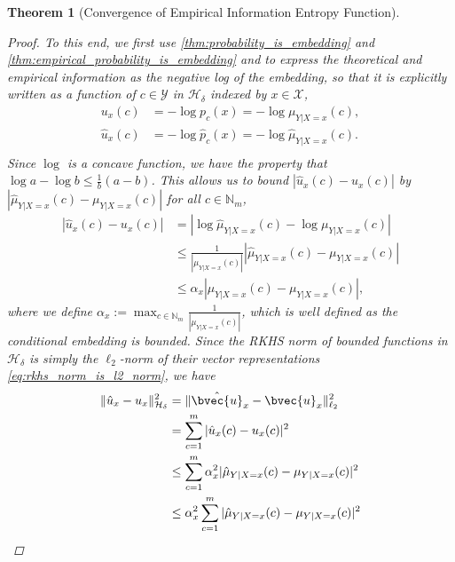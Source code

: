 \documentclass{article}
\newtheorem{theorem}{Theorem}[section]
\begin{document}
\begin{theorem}[Convergence of Empirical Information Entropy Function]
\begin{proof}
				To this end, we first use \cref{thm:probability_is_embedding} and \cref{thm:empirical_probability_is_embedding} and to express the theoretical and empirical information as the negative log of the embedding, so that it is explicitly written as a function of $c \in \mathcal{Y}$ in $\mathcal{H}_{\delta}$ indexed by $x \in \mathcal{X}$,
				\begin{equation}
					\begin{aligned}
						u_{x}(c) &= - \log{p_{c}(x)} = -\log{\mu_{Y | X = x}(c)}, \\
						\hat{u}_{x}(c) &= - \log{\hat{p}_{c}(x)} = -\log{\hat{\mu}_{Y | X = x}(c)}. \\
					\end{aligned}
				\end{equation}
				Since $\log$ is a concave function, we have the property that $\log{a} - \log{b} \leq \frac{1}{b} (a - b)$. This allows us to bound $| \hat{u}_{x}(c) - u_{x}(c) |$ by $| \hat{\mu}_{Y | X = x}(c) - \mu_{Y | X = x}(c) |$ for all $c \in \mathbb{N}_{m}$,
				\begin{equation}
					\begin{aligned}
						| \hat{u}_{x}(c) - u_{x}(c) | &= | \log{\hat{\mu}_{Y | X = x}(c)} - \log{\mu_{Y | X = x}(c)} | \\
						&\leq \frac{1}{| \mu_{Y | X = x}(c) |} | \hat{\mu}_{Y | X = x}(c) - \mu_{Y | X = x}(c) | \\
						&\leq \alpha_{x} | \hat{\mu}_{Y | X = x}(c) - \mu_{Y | X = x}(c) |,
					\end{aligned}
				\end{equation}
				where we define $\alpha_{x} := \max_{c \in \mathbb{N}_{m}} \frac{1}{| \mu_{Y | X = x}(c) |}$, which is well defined as the conditional embedding is bounded. Since the RKHS norm of bounded functions in $\mathcal{H}_{\delta}$ is simply the $\ell_{2}$-norm of their vector representations \eqref{eq:rkhs_norm_is_l2_norm}, we have
				\begin{equation}
					\begin{aligned}
						\| \hat{u}_{x} - u_{x} \|_{\mathcal{H}_{\delta}}^{2} &= \| \hat{\bvec{u}}_{x} - \bvec{u}_{x} \|_{\ell_{2}}^{2} \\
						&= \sum_{c = 1}^{m} | \hat{u}_{x}(c) - u_{x}(c) |^{2} \\
						&\leq \sum_{c = 1}^{m} \alpha_{x}^{2} | \hat{\mu}_{Y | X = x}(c) - \mu_{Y | X = x}(c) |^{2} \\
						&\leq \alpha_{x}^{2} \sum_{c = 1}^{m} | \hat{\mu}_{Y | X = x}(c) - \mu_{Y | X = x}(c) |^{2} \\

\end{aligned}
\end{equation}
\end{proof}
\end{theorem}
\end{document}
